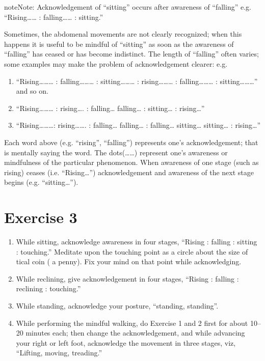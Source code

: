 \documentclass[a5paper,10pt,english]{book}
\begin{document}
\begin{sphinxadmonition}{note}{Note:}
\sphinxAtStartPar
Acknowledgement of “sitting” occurs after awareness of “falling” e.g. “Rising…… : falling…… : sitting.”

\sphinxAtStartPar
Sometimes, the abdomenal movements are not clearly recognized; when this happens it is useful to be mindful of “sitting” as soon as the awareness of “falling” has ceased or has become indistinct. The length of “falling” often varies; some examples may make the problem of acknowledgement clearer: e.g.
\begin{enumerate}
%
\item {} 
\sphinxAtStartPar
“Rising……… : falling……… : sitting……… : rising……… : falling……… : sitting………” and so on.

\item {} 
\sphinxAtStartPar
“Rising……… : rising…. : falling… falling… : sitting… : rising…”

\item {} 
\sphinxAtStartPar
“Rising………: rising……. : falling… falling… : falling… sitting… sitting… : rising…”

\end{enumerate}
\end{sphinxadmonition}

\sphinxAtStartPar
{} Each word above (e.g. “rising”, “falling”) represents one’s acknowledgement; that is mentally saying the word. The dots(……) represent one’s awareness or mindfulness of the particular phenomenon. When awareness of one stage (such as rising) ceases (i.e. “Rising…”) acknowledgement and awareness of the next stage begins (e.g. “sitting…”).


\section{Exercise 3}
\label{\detokenize{practice:exercise-3}}\begin{enumerate}
%
\item {} 
\sphinxAtStartPar
While sitting, acknowledge awareness in four stages, “Rising : falling : sitting : touching.” Meditate upon the touching point as a circle about the size of tical coin ( a penny). Fix your mind \sphinxhyphen{}on that point while acknowledging.

\item {} 
\sphinxAtStartPar
While reclining, give acknowledgement in four stages, “Rising : falling : reclining : touching.”

\item {} 
\sphinxAtStartPar
While standing, acknowledge your posture, “standing, standing”.

\item {} 
\sphinxAtStartPar
While performing the mindful walking, do Exercise 1 and 2 first for about 10–20 minutes each; then change the acknowledgement, and while advancing your right or left foot, acknowledge the movement in three stages, viz, “Lifting, moving, treading.”

\end{enumerate}
\end{document}
